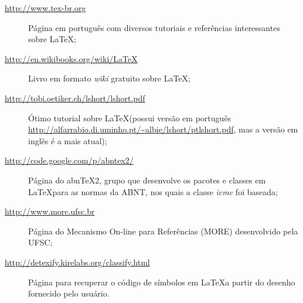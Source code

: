 \begin{description}
 \item[\url{http://www.tex-br.org}] Página em português com diversos tutoriais e referências interessantes sobre \LaTeX;
 \item[\url{http://en.wikibooks.org/wiki/LaTeX}] Livro em formato \textit{wiki} gratuito sobre \LaTeX;
 \item[\url{http://tobi.oetiker.ch/lshort/lshort.pdf}] Ótimo tutorial sobre \LaTeX (possui versão em português \url{http://alfarrabio.di.uminho.pt/~albie/lshort/ptlshort.pdf}, mas a versão em inglês é a mais atual);
 \item[\url{http://code.google.com/p/abntex2/}] Página do abnTeX2, grupo que desenvolve os pacotes e classes em \LaTeX para as normas da ABNT, nos quais a classe \textit{icmc} foi baseada;
\item[\url{http://www.more.ufsc.br}] Página do Mecanismo On-line para Referências  (MORE) desenvolvido pela UFSC;
\item[\url{http://detexify.kirelabs.org/classify.html}] Página para recuperar o código de símbolos em \LaTeX a partir do desenho fornecido pelo usuário.
 \end{description}